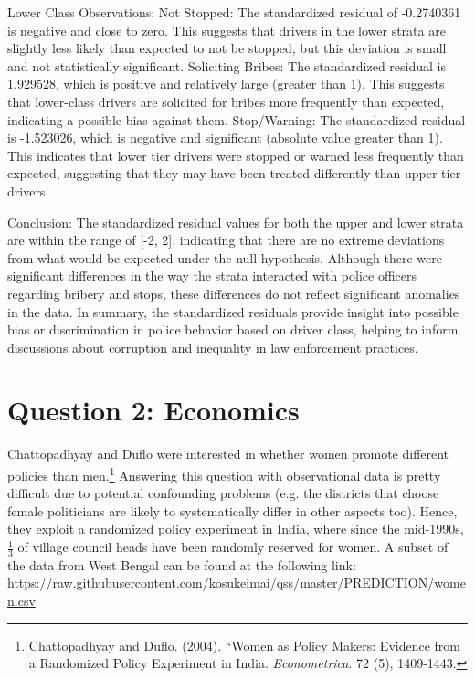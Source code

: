 \documentclass[12pt,letterpaper]{article}
\begin{document}
\begin{enumerate}
		Lower Class Observations:
		Not Stopped: The standardized residual of -0.2740361 is negative and close to zero. This suggests that drivers in the lower strata are slightly less likely than expected to not be stopped, but this deviation is small and not statistically significant.
		Soliciting Bribes: The standardized residual is 1.929528, which is positive and relatively large (greater than 1). This suggests that lower-class drivers are solicited for bribes more frequently than expected, indicating a possible bias against them.
		Stop/Warning: The standardized residual is -1.523026, which is negative and significant (absolute value greater than 1). This indicates that lower tier drivers were stopped or warned less frequently than expected, suggesting that they may have been treated differently than upper tier drivers.
		
		Conclusion:
		The standardized residual values for both the upper and lower strata are within the range of [-2, 2], indicating that there are no extreme deviations from what would be expected under the null hypothesis. Although there were significant differences in the way the strata interacted with police officers regarding bribery and stops, these differences do not reflect significant anomalies in the data.
		In summary, the standardized residuals provide insight into possible bias or discrimination in police behavior based on driver class, helping to inform discussions about corruption and inequality in law enforcement practices.
		
		
		
	\end{enumerate}
	\newpage
	
	\section*{Question 2: Economics}
	Chattopadhyay and Duflo were interested in whether women promote different policies than men.\footnote{Chattopadhyay and Duflo. (2004). ``Women as Policy Makers: Evidence from a Randomized Policy Experiment in India. \textit{Econometrica}. 72 (5), 1409-1443.} Answering this question with observational data is pretty difficult due to potential confounding problems (e.g. the districts that choose female politicians are likely to systematically differ in other aspects too). Hence, they exploit a randomized policy experiment in India, where since the mid-1990s, $\frac{1}{3}$ of village council heads have been randomly reserved for women. A subset of the data from West Bengal can be found at the following link: \url{https://raw.githubusercontent.com/kosukeimai/qss/master/PREDICTION/women.csv}\\
	
\end{document}
